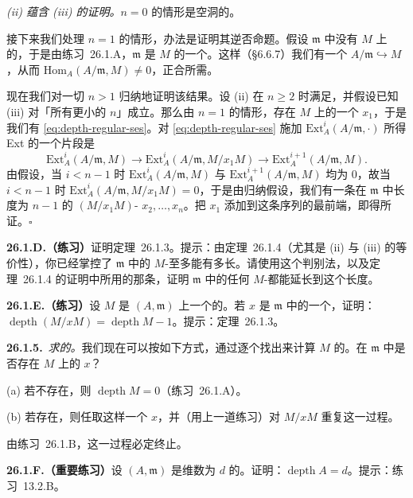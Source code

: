 \emph{(ii) 蕴含 (iii) 的证明。}\quad $n=0$ 的情形是空洞的。

接下来我们处理 $n=1$ 的情形，办法是证明其逆否命题。假设 $\mathfrak{m}$ 中没有 $M$ 上的\trNonZerodivisor，于是由\mbox{练习~26.1.A}，$\mathfrak{m}$ 是 $M$ 的一个\trAssociatedPrimeIdeal。这样（\S6.6.7）我们有一个\trInjectiveMap{} $A/\mathfrak{m}\hookrightarrow M$，从而 $\mathrm{Hom}_A(A/\mathfrak{m},M)\neq 0$，正合所需。

现在我们对一切 $n>1$ 归纳地证明该结果。设 (ii) 在 $n\ge 2$ 时满足，并假设已知 (iii) 对「所有更小的 $n$」成立。那么由 $n=1$ 的情形，存在 $M$ 上的一个\trNonZerodivisor{} $x_1$，于是我们有\trShortExactSequence{} \eqref{eq:depth-regular-ses}。对 \eqref{eq:depth-regular-ses} 施加 $\mathrm{Ext}^i_A(A/\mathfrak{m},\cdot)$ 所得 Ext \trLongExactSequence{}的一个片段是
\[
\mathrm{Ext}^i_A(A/\mathfrak{m},M) \longrightarrow \mathrm{Ext}^i_A(A/\mathfrak{m},M/x_1 M) \longrightarrow \mathrm{Ext}^{i+1}_A(A/\mathfrak{m},M).
\]
由假设，当 $i<n-1$ 时 $\mathrm{Ext}^i_A(A/\mathfrak{m},M)$ 与 $\mathrm{Ext}^{i+1}_A(A/\mathfrak{m},M)$ 均为 $0$，故当 $i<n-1$ 时 $\mathrm{Ext}^i_A(A/\mathfrak{m},M/x_1 M)=0$，于是由归纳假设，我们有一条在 $\mathfrak{m}$ 中长度为 $n-1$ 的 $(M/x_1 M)$-\trRegularSequence{} $x_2,\dots,x_n$。把 $x_1$ 添加到这条序列的最前端，即得所证。\hfill$\square$

\textbf{26.1.D.（练习）}\quad 证明\mbox{定理~26.1.3}。提示：由\mbox{定理~26.1.4}（尤其是 (ii) 与 (iii) 的等价性），你已经掌控了 $\mathfrak{m}$ 中的 $M$-\trRegularSequence{}至多能有多长。请使用这个判别法，以及\mbox{定理~26.1.4} 的证明中所用的那条\trLongExactSequence，证明 $\mathfrak{m}$ 中的任何 $M$-\trRegularSequence{}都能延长到这个长度。

\textbf{26.1.E.（练习）}\quad 设 $M$ 是\trNoetherian\trLocalRing{} $(A,\mathfrak{m})$ 上一个\trFinitelyGenerated{}的\trModule。若 $x$ 是 $\mathfrak{m}$ 中的一个\trNonZerodivisor，证明：$\operatorname{depth}(M/xM)=\operatorname{depth}M-1$。提示：\mbox{定理~26.1.3}。

\textbf{26.1.5.}\ \emph{求\trModule{}的\trDepth。}\quad 我们现在可以按如下方式，通过逐个找出\trNonZerodivisor{}来计算 $M$ 的\trDepth。在 $\mathfrak{m}$ 中是否存在 $M$ 上的\trNonZerodivisor{} $x$？

(a) 若不存在，则 $\operatorname{depth}M=0$（\mbox{练习~26.1.A}）。

(b) 若存在，则任取这样一个 $x$，并（用上一道练习）对 $M/xM$ 重复这一过程。

由\mbox{练习~26.1.B}，这一过程必定终止。

\textbf{26.1.F.（重要练习）}\quad 设 $(A,\mathfrak{m})$ 是维数为 $d$ 的\trRegular\trLocalRing。证明：$\operatorname{depth}A=d$。提示：\mbox{练习~13.2.B}。

